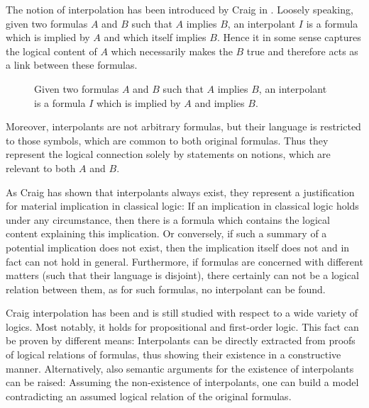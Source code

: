 

The notion of interpolation has been introduced by Craig in \cite{Craig57linear}.
Loosely speaking, given two formulas $A$ and $B$ such that $A$ implies $B$, an interpolant $I$ is a formula which is implied by $A$ and which itself implies $B$.
Hence it in some sense captures the logical content of $A$ which necessarily makes the $B$ true and therefore acts as a link between these formulas.

\begin{figure}[htbp]
	\centering
	\caption{Given two formulas $A$ and $B$ such that $A$ implies $B$, an interpolant is a formula $I$ which is implied by $A$ and implies $B$.}
\end{figure}
Moreover, interpolants are not arbitrary formulas, but their language is restricted to those symbols, which are common to both original formulas.
Thus they represent the logical connection solely by statements on notions, which are relevant to both $A$ and $B$.

As Craig has shown that interpolants always exist, they represent a justification for material implication in classical logic:
If an implication in classical logic holds under any circumstance, then there is a formula which contains the logical content explaining this implication.
Or conversely, if such a summary of a potential implication does not exist, then the implication itself does not and in fact can not hold in general.
Furthermore, if formulas are concerned with different matters (such that their language is disjoint), there certainly can not be a logical relation between them, as for such formulas, no interpolant can be found.

Craig interpolation has been and is still studied with respect to a wide variety of logics.
Most notably, it holds for propositional and first-order logic.
This fact can be proven by different means:
Interpolants can be directly extracted from proofs of logical relations of formulas, thus showing their existence in a constructive manner.
Alternatively, also semantic arguments for the existence of interpolants can be raised:
Assuming the non-existence of interpolants, one can build a model contradicting an assumed logical relation of the original formulas.

